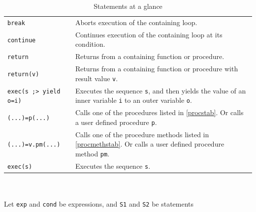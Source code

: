 \begin{table}[htbp]
\begin{minipage}{\linewidth}
\begin{tabularx}{\linewidth}{|lX|}
\hline
\texttt{break} & Aborts execution of the containing loop.\\
\texttt{continue} & Continues execution of the containing loop at its condition.\\
\texttt{return} & Returns from a containing function or procedure.\\
\texttt{return(v)} & Returns from a containing function or procedure with result value \texttt{v}.\\
\hline
\texttt{exec(s ;> yield o=i)} & Executes the sequence \texttt{s}, and then yields the value of an inner variable \texttt{i} to an outer variable \texttt{o}.\\
\hline
\texttt{(...)=p(...)}	& Calls one of the procedures listed in \ref{procstab}. Or calls a user defined procedure \texttt{p}.\\
\texttt{(...)=v.pm(...)}	& Calls one of the procedure methods listed in \ref{procmethstab}. Or calls a user defined procedure method \texttt{pm}.\\
\hline
\texttt{exec(s)} & Executes the sequence \texttt{s}.\\
\hline
\end{tabularx}
\end{minipage}\\
\\ 
{\small Let \texttt{exp} and \texttt{cond} be expressions, and \texttt{S1} and \texttt{S2} be statements}
\caption{Statements at a glance}
\label{statementstab}
\end{table}



